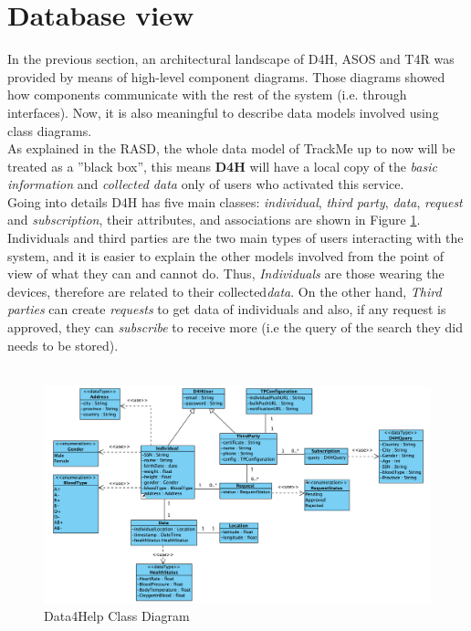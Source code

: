 \documentclass[a4paper, hidelinks, 12pt]{report}
\begin{document}
	\section{Database view}
	In the previous section, an architectural landscape of D4H, ASOS and T4R was provided by means of high-level component diagrams. Those diagrams showed how components communicate with the rest of the system (i.e. through interfaces). Now, it is also meaningful to describe data models involved using class diagrams. \\
	
	As explained in the RASD, the whole data model of TrackMe up to now will be treated as a ”black box”, this means \textbf{D4H} will have a local copy of the \textit{basic information} and \textit{collected data} only of users who activated this service. \\
	 
	Going into details D4H has five main classes: \textit{individual}, \textit{third party}, \textit{data}, \textit{request} and \textit{subscription}, their attributes, and associations are shown in Figure \ref{fig:Data4Help Class Diagram}. Individuals and third parties are the two main types of users interacting with the system, and it is easier to explain the other models involved from the point of view of what they can and cannot do. Thus, \textit{Individuals} are those wearing the devices, therefore are related to their collected\textit{data}. On the other hand, \textit{Third parties} can create \textit{requests} to get data of individuals and also, if any request is approved, they can \textit{subscribe} to receive more (i.e the query of the search they did needs to be stored). \\\\
	
	\begin{figure}[H]
    		\centering
		\includegraphics[width=1\textwidth]{diagrams/d4h_class_diagram.png}
		\caption[Data4Help Class Diagram]{Data4Help Class Diagram}
		\label{fig:Data4Help Class Diagram}
	\end{figure}
	
\end{document}
